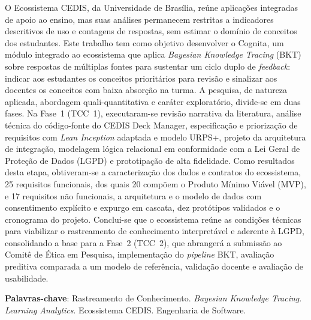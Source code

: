 
\begin{resumo}
O Ecossistema CEDIS, da Universidade de Brasília, reúne aplicações integradas de apoio ao ensino, mas suas análises permanecem restritas a indicadores descritivos de uso e contagens de respostas, sem estimar o domínio de conceitos dos estudantes. Este trabalho tem como objetivo desenvolver o Cognita, um módulo integrado ao ecossistema que aplica \textit{Bayesian Knowledge Tracing} (BKT) sobre respostas de múltiplas fontes para sustentar um ciclo duplo de \textit{feedback}: indicar aos estudantes os conceitos prioritários para revisão e sinalizar aos docentes os conceitos com baixa absorção na turma. A pesquisa, de natureza aplicada, abordagem quali-quantitativa e caráter exploratório, divide-se em duas fases. Na Fase~1 (TCC~1), executaram-se revisão narrativa da literatura, análise técnica do código-fonte do CEDIS Deck Manager, especificação e priorização de requisitos com \textit{Lean Inception} adaptada e modelo URPS+, projeto da arquitetura de integração, modelagem lógica relacional em conformidade com a Lei Geral de Proteção de Dados (LGPD) e prototipação de alta fidelidade. Como resultados desta etapa, obtiveram-se a caracterização dos dados e contratos do ecossistema, 25 requisitos funcionais, dos quais 20 compõem o Produto Mínimo Viável (MVP), e 17 requisitos não funcionais, a arquitetura e o modelo de dados com consentimento explícito e expurgo em cascata, dez protótipos validados e o cronograma do projeto. Conclui-se que o ecossistema reúne as condições técnicas para viabilizar o rastreamento de conhecimento interpretável e aderente à LGPD, consolidando a base para a Fase~2 (TCC~2), que abrangerá a submissão ao Comitê de Ética em Pesquisa, implementação do \textit{pipeline} BKT, avaliação preditiva comparada a um modelo de referência, validação docente e avaliação de usabilidade.

\vspace{\onelineskip}

\noindent
\textbf{Palavras-chave}: Rastreamento de Conhecimento. \textit{Bayesian Knowledge Tracing}. \textit{Learning Analytics}. Ecossistema CEDIS. Engenharia de Software.
\end{resumo}
